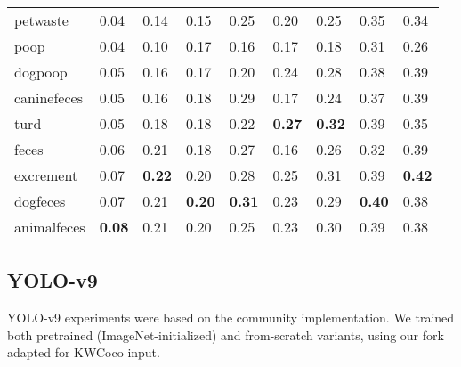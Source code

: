 \begin{table}[t]
\begin{tabular}{lllllllll}
 petwaste    & 0.04                 & 0.14                  & 0.15                 & 0.25                  & 0.20                 & 0.25                  & 0.35                 & 0.34                  \\
 poop        & 0.04                 & 0.10                  & 0.17                 & 0.16                  & 0.17                 & 0.18                  & 0.31                 & 0.26                  \\
 dogpoop     & 0.05                 & 0.16                  & 0.17                 & 0.20                  & 0.24                 & 0.28                  & 0.38                 & 0.39                  \\
 caninefeces & 0.05                 & 0.16                  & 0.18                 & 0.29                  & 0.17                 & 0.24                  & 0.37                 & 0.39                  \\
 turd        & 0.05                 & 0.18                  & 0.18                 & 0.22                  & \textbf{0.27}        & \textbf{0.32}         & 0.39                 & 0.35                  \\
 feces       & 0.06                 & 0.21                  & 0.18                 & 0.27                  & 0.16                 & 0.26                  & 0.32                 & 0.39                  \\
 excrement   & 0.07                 & \textbf{0.22}         & 0.20                 & 0.28                  & 0.25                 & 0.31                  & 0.39                 & \textbf{0.42}         \\
 dogfeces    & 0.07                 & 0.21                  & \textbf{0.20}        & \textbf{0.31}         & 0.23                 & 0.29                  & \textbf{0.40}        & 0.38                  \\
 animalfeces & \textbf{0.08}        & 0.21                  & 0.20                 & 0.25                  & 0.23                 & 0.30                  & 0.39                 & 0.38                  \\
\bottomrule
\end{tabular}
\end{table}


\subsection{YOLO-v9}

YOLO-v9 experiments were based on the community  implementation.
We trained both pretrained (ImageNet-initialized) and from-scratch variants, using our fork adapted for
  KWCoco input.

